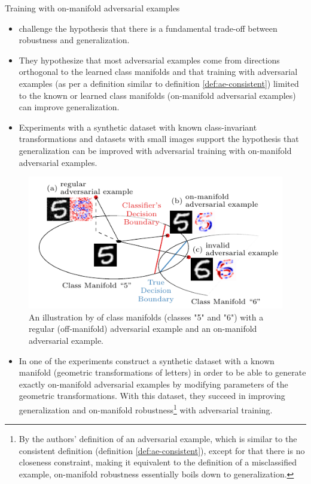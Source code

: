 \documentclass{beamer}
\newcommand{\citet}[1]{{\color{citecolor}\relscale{0.8}\textcite{#1}}}
\begin{document}
\begin{frame}[allowframebreaks=0.9]{Training with on-manifold adversarial examples}
	\begin{itemize}
		\item \citet{Stutz:2018:DARG} challenge the hypothesis that there is a fundamental trade-off between robustness and generalization. 
		
		\item They hypothesize that most adversarial examples come from directions orthogonal to the learned class manifolds and that training with adversarial examples (as per a definition similar to definition \ref{def:ae-consistent}) limited to the known or learned class manifolds (on-manifold adversarial examples) can improve generalization. 
		\item Experiments with a synthetic dataset with known class-invariant transformations and datasets with small images support the hypothesis that generalization can be improved with adversarial training with on-manifold adversarial examples.
	\end{itemize}

		\begin{figure}[htbp!]
			\begin{center}
				\includegraphics[width=\columnwidth]{figures/adversarial-examples/stutz-introduction_b.pdf}
			\end{center}
			\caption{An illustration by \citet{Stutz:2018:DARG} of class manifolds (classes "5" and "6") with a regular (off-manifold) adversarial example and an on-manifold adversarial example.}
			\label{fig:stutz-illustration}
		\end{figure}
	\begin{itemize}
		\item In one of the experiments \citet{Stutz:2018:DARG} construct a synthetic dataset with a known manifold (geometric transformations of letters) in order to be able to generate exactly on-manifold adversarial examples by modifying parameters of the geometric transformations. With this dataset, they succeed in improving generalization and on-manifold robustness\footnote[frame]{By the authors' definition of an adversarial example, which is similar to the consistent definition (definition \ref{def:ae-consistent}), except for that there is no closeness constraint, making it equivalent to the definition of a misclassified example, on-manifold robustness essentially boils down to generalization.} with adversarial training.
		

\end{itemize}
\end{frame}
\end{document}
